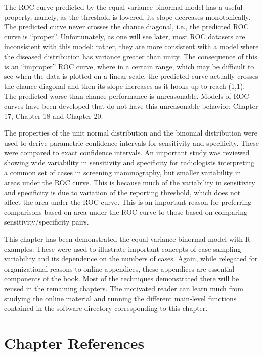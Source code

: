 \documentclass[
]{book}
\begin{document}
The ROC curve predicted by the equal variance binormal model has a useful property, namely, as the threshold is lowered, its slope decreases monotonically. The predicted curve never crosses the chance diagonal, i.e., the predicted ROC curve is ``proper''. Unfortunately, as one will see later, most ROC datasets are inconsistent with this model: rather, they are more consistent with a model where the diseased distribution has variance greater than unity. The consequence of this is an ``improper'' ROC curve, where in a certain range, which may be difficult to see when the data is plotted on a linear scale, the predicted curve actually crosses the chance diagonal and then its slope increases as it hooks up to reach (1,1). The predicted worse than chance performance is unreasonable. Models of ROC curves have been developed that do not have this unreasonable behavior: Chapter 17, Chapter 18 and Chapter 20.

The properties of the unit normal distribution and the binomial distribution were used to derive parametric confidence intervals for sensitivity and specificity. These were compared to exact confidence intervals. An important study was reviewed showing wide variability in sensitivity and specificity for radiologists interpreting a common set of cases in screening mammography, but smaller variability in areas under the ROC curve. This is because much of the variability in sensitivity and specificity is due to variation of the reporting threshold, which does not affect the area under the ROC curve. This is an important reason for preferring comparisons based on area under the ROC curve to those based on comparing sensitivity/specificity pairs.

This chapter has been demonstrated the equal variance binormal model with R examples. These were used to illustrate important concepts of case-sampling variability and its dependence on the numbers of cases. Again, while relegated for organizational reasons to online appendices, these appendices are essential components of the book. Most of the techniques demonstrated there will be reused in the remaining chapters. The motivated reader can learn much from studying the online material and running the different main-level functions contained in the software-directory corresponding to this chapter.

\hypertarget{binary-task-model-references}{%
\section{Chapter References}\label{binary-task-model-references}}
\end{document}

